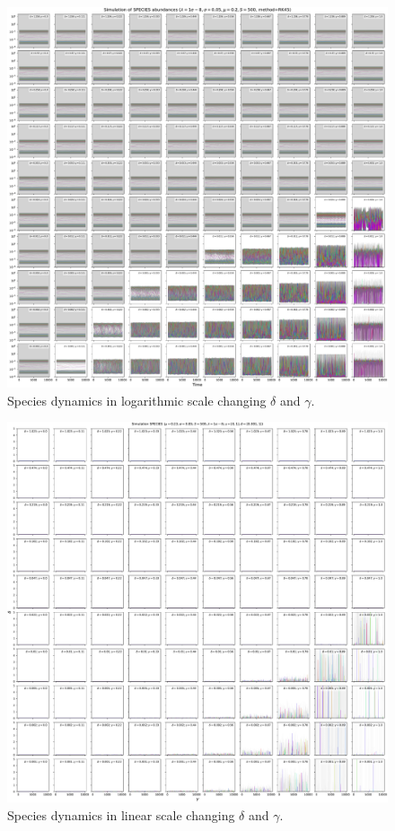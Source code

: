 \documentclass{article}
\begin{document}
\begin{figure}[H]
    \centering
    \includegraphics[width=\linewidth]{DeltaGamma/10Species.pdf}
    \caption{Species dynamics in logarithmic scale changing $\delta$ and $\gamma$.}
\end{figure}

\clearpage

\begin{figure}[H]
    \centering
    \includegraphics[width=\linewidth]{DeltaGamma/10SpeciesFPLinear.pdf}
    \caption{Species dynamics in linear scale changing $\delta$ and $\gamma$.}
\end{figure}
\end{document}
